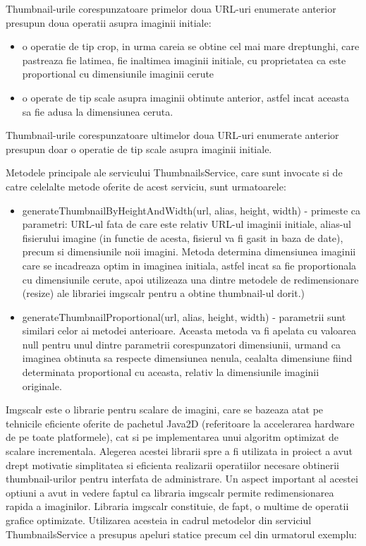 \bigskip

Thumbnail-urile corespunzatoare primelor doua URL-uri enumerate anterior presupun doua operatii asupra imaginii initiale: 
\begin{itemize}
\item {o operatie de tip crop, in urma careia se obtine cel mai mare dreptunghi, care pastreaza fie latimea, fie inaltimea imaginii initiale, cu proprietatea ca este proportional cu dimensiunile imaginii cerute}
\item{o operate de tip scale asupra imaginii obtinute anterior, astfel incat aceasta sa fie adusa la dimensiunea ceruta.}
\end{itemize}  

Thumbnail-urile corespunzatoare ultimelor doua URL-uri enumerate anterior presupun doar o operatie de tip scale asupra imaginii initiale.

\bigskip

Metodele principale ale servicului ThumbnailsService, care sunt invocate si de catre celelalte metode oferite de acest serviciu, sunt urmatoarele:

\begin{itemize}
\item{generateThumbnailByHeightAndWidth(url, alias, height, width) - primeste ca parametri: URL-ul fata de care este relativ URL-ul imaginii initiale, alias-ul fisierului imagine (in functie de acesta, fisierul va fi gasit in baza de date), precum si dimensiunile noii imagini. Metoda determina dimensiunea imaginii care se incadreaza optim in imaginea initiala, astfel incat sa fie proportionala cu dimensiunile cerute, apoi utilizeaza una dintre metodele de redimensionare (resize) ale librariei imgscalr pentru a obtine thumbnail-ul dorit.)}
\item{generateThumbnailProportional(url, alias, height, width) - parametrii sunt similari celor ai metodei anterioare. Aceasta metoda va fi apelata cu valoarea null pentru unul dintre parametrii corespunzatori dimensiunii, urmand ca imaginea obtinuta sa respecte dimensiunea nenula, cealalta dimensiune fiind determinata proportional cu aceasta, relativ la dimensiunile imaginii originale.}
\end{itemize}

\bigskip

Imgscalr este o librarie pentru scalare de imagini, care se bazeaza atat pe tehnicile eficiente oferite de pachetul Java2D (referitoare la accelerarea hardware de pe toate platformele), cat si pe implementarea unui algoritm optimizat de scalare incrementala. 
Alegerea acestei librarii spre a fi utilizata in proiect a avut drept motivatie simplitatea si eficienta realizarii operatiilor necesare obtinerii thumbnail-urilor pentru interfata de administrare. Un aspect important al acestei optiuni a avut in vedere faptul ca libraria imgscalr permite redimensionarea rapida a imaginilor.
Libraria imgscalr constituie, de fapt, o multime  de operatii grafice optimizate. Utilizarea acesteia in cadrul metodelor din serviciul ThumbnailsService a presupus apeluri statice precum cel din urmatorul exemplu:

